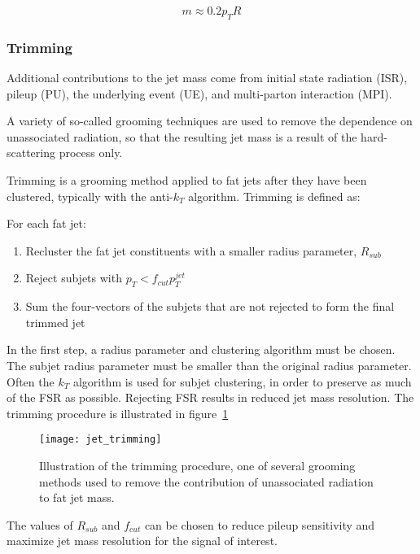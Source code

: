 \begin{equation}\label{eq:jet_mass_nlo}
    m \approx 0.2 p_T R
\end{equation}\cite{jet-mass-nlo}

\subsubsection{Trimming}

Additional contributions to the jet mass come from initial state radiation (ISR),
pileup (PU), the underlying event (UE), and multi-parton interaction (MPI).

A variety of so-called grooming techniques are used to remove the dependence on unassociated radiation,
so that the resulting jet mass is a result of the hard-scattering process only.

Trimming is a grooming method applied to fat jets after they have been clustered, typically with the anti-$k_T$ algorithm.
Trimming is defined as:

For each fat jet:
\begin{enumerate}
    \item Recluster the fat jet constituents with a smaller radius parameter, $R_{sub}$
    \item Reject subjets with $p_{T} < f_{cut} p_T^{jet}$
    \item Sum the four-vectors of the subjets that are not rejected to form the final trimmed jet
\end{enumerate}

In the first step, a radius parameter and clustering algorithm must be chosen.
The subjet radius parameter must be smaller than the original radius parameter.
Often the $k_T$ algorithm is used for subjet clustering, in order to preserve as much of the FSR as possible.
Rejecting FSR results in reduced jet mass resolution.\cite{jet-tasi-substructure}
The trimming procedure is illustrated in figure~\ref{fig:jet_trimming}

\begin{figure}[h!]
    \centering
\texttt{[image: jet\_trimming]}
\caption{Illustration of the trimming procedure, one of several grooming methods used to remove the contribution
of unassociated radiation to fat jet mass.}
\label{fig:jet_trimming}
\end{figure}

The values of $R_{sub}$ and $f_{cut}$ can be chosen to reduce pileup sensitivity and maximize jet mass resolution for the signal of interest.

